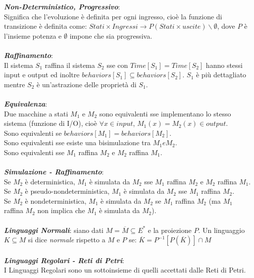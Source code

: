 \documentclass[a4paper, notitlepage, 10pt]{report}
\begin{document}
\noindent
\textit{\textbf{Non-Deterministico, Progressivo}}:\\
Significa che l'evoluzione è definita per ogni ingresso, cioè la funzione di transizione è definita come: $Stati \times Ingressi \rightarrow P(Stati \times uscite)\backslash \emptyset$, dove $P$ è l'insieme potenza e $\emptyset$ impone che sia progressiva.
\\\\
\textit{\textbf{Raffinamento}}:\\
Il sistema $S_1$ raffina il sistema $S_2$ sse con $Time[S_1] = Time[S_2]$ hanno stessi input e output ed inoltre $behaviors [S_1] \subseteq behaviors [S_2]$. $S_1$ è più dettagliato mentre $S_2$ è un'astrazione delle proprietà di $S_1$.
\\\\
\textit{\textbf{Equivalenza}}:\\
Due macchine a stati $M_1$ e $M_2$ sono equivalenti sse implementano lo stesso sistema (funzione di I/O), cioè $\forall x \in input$, $M_1(x) = M_2(x) \in output$.\\
Sono equivalenti se $behaviors [M_1] = behaviors [M_2]$.\\
Sono equivalenti sse esiste una bisimulazione tra $M_1 e M_2$. 
\\Sono equivalenti sse $M_1$ raffina $M_2$ e $M_2$ raffina $M_1$.
\\\\
\textit{\textbf{Simulazione - Raffinamento}}:\\
Se $M_2$ è deterministica, $M_1$ è simulata da $M_2$ sse $M_1$ raffina $M_2$ e $M_2$ raffina $M_1$.
\\
Se $M_2$ è pseudo-nondeterministica, $M_1$ è simulata da $M_2$ sse $M_1$ raffina $M_2$.
\\
Se $M_2$ è nondeterministica, $M_1$ è simulata da $M_2$ se $M_1$ raffina $M_2$ (ma $M_1$ raffina $M_2$ non implica che $M_1$ è simulata da $M_2$).
\\\\
\textit{\textbf{Linguaggi Normali}}: siano dati $M = \overline{M} \subseteq E^*$ e la proiezione $P$. Un linguaggio $K \subseteq M$ si dice \textit{normale} rispetto a $M$ e $P$ se: $ \overline{K} = P^{-1} [P(\overline{K})] \cap M $
\\\\
\textit{\textbf{Linguaggi Regolari - Reti di Petri}}:\\
I Linguaggi Regolari sono un sottoinsieme di quelli accettati dalle Reti di Petri.
\\\\
\end{document}

